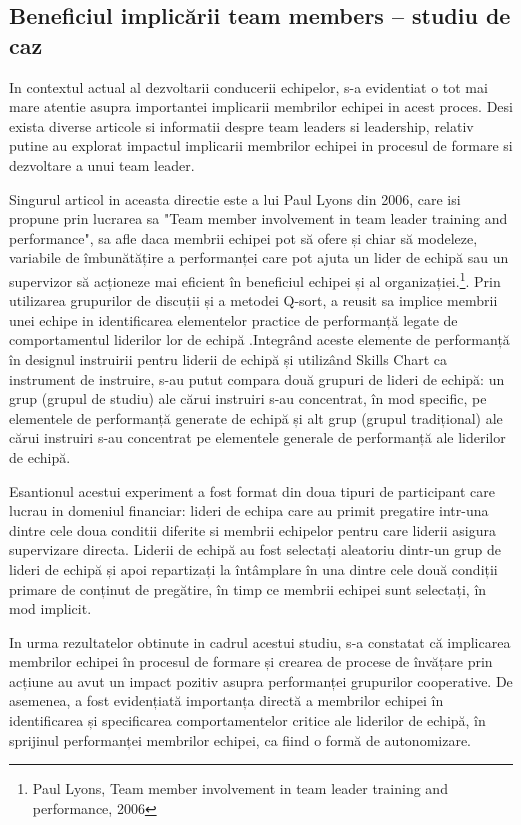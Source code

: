 \documentclass[a4paper, 12pt]{article}
\begin{document}
\begin{itemize}
	\subsection {Beneficiul implicării team members – studiu de caz }
	
	
	\quad\quad  In contextul actual al dezvoltarii conducerii echipelor, s-a evidentiat o tot mai mare atentie asupra importantei implicarii membrilor echipei in acest proces. Desi exista diverse articole si informatii despre team leaders si leadership, relativ putine au explorat impactul implicarii membrilor echipei in procesul de formare si dezvoltare a unui team leader. 

	\quad Singurul articol in aceasta directie este a lui Paul Lyons din 2006, care isi propune prin lucrarea sa "Team member involvement in team leader training and performance", sa afle daca membrii echipei pot să ofere și chiar să modeleze, variabile de îmbunătățire a performanței care pot ajuta un lider de echipă sau un supervizor să acționeze mai eficient în beneficiul echipei și al organizației.\footnote{Paul Lyons, Team member involvement in team leader training and performance, 2006}.  Prin utilizarea grupurilor de discuții și a metodei Q-sort, a reusit sa implice membrii unei echipe in identificarea elementelor practice de performanță legate de comportamentul liderilor lor de echipă .Integrând aceste elemente de performanță în designul instruirii pentru liderii de echipă și utilizând Skills Chart ca instrument de instruire, s-au putut compara două grupuri de lideri de echipă: un grup (grupul de studiu) ale cărui instruiri s-au concentrat, în mod specific, pe elementele de performanță generate de echipă și alt grup (grupul tradițional) ale cărui instruiri s-au concentrat pe elementele generale de performanță ale liderilor de echipă. 

	\quad Esantionul acestui experiment a fost format din doua tipuri de participant care lucrau in domeniul financiar: lideri de echipa care au primit pregatire intr-una dintre cele doua conditii diferite si membrii echipelor pentru care liderii asigura supervizare directa. Liderii de echipă au fost selectați aleatoriu dintr-un grup de lideri de echipă și apoi repartizați la întâmplare în una dintre cele două condiții primare de conținut de pregătire, în timp ce membrii echipei sunt selectați, în mod implicit. 

	\quad In urma rezultatelor obtinute in cadrul acestui studiu, s-a constatat că implicarea membrilor echipei în procesul de formare și crearea de procese de învățare prin acțiune au avut un impact pozitiv asupra performanței grupurilor cooperative. De asemenea, a fost evidențiată importanța directă a membrilor echipei în identificarea și specificarea comportamentelor critice ale liderilor de echipă, în sprijinul performanței membrilor echipei, ca fiind o formă de autonomizare. 


\end{itemize}
\end{document}
